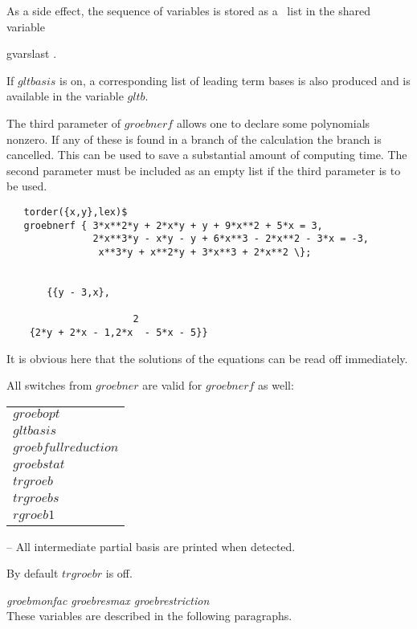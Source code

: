 As a side effect, the sequence of variables is stored as a \REDUCE \  list in
the shared variable
\begin{center}
gvarslast .
\end{center}
If $gltbasis$ is on, a corresponding list of leading term bases is
also produced and is available in the variable $gltb$.

The third parameter of $groebnerf$ allows one to declare some polynomials
nonzero. If any of these is found in a branch of the calculation
the branch is cancelled. This can be used to save a substantial amount
of computing time. The second parameter must be included as an
empty list if the third parameter is to be used.

\begin{verbatim}
   torder({x,y},lex)$
   groebnerf { 3*x**2*y + 2*x*y + y + 9*x**2 + 5*x = 3,
               2*x**3*y - x*y - y + 6*x**3 - 2*x**2 - 3*x = -3,
                x**3*y + x**2*y + 3*x**3 + 2*x**2 \};


       {{y - 3,x},

                      2
    {2*y + 2*x - 1,2*x  - 5*x - 5}}
\end{verbatim}

It is obvious here that the solutions of the equations can be read
off immediately.

All switches from $groebner$ are valid for $groebnerf$ as well:
\begin{center}
\begin{tabular}{l}
$groebopt$ \\
$gltbasis$ \\
$groebfullreduction$ \\
$groebstat$ \\
$trgroeb$ \\
$trgroebs$ \\
$rgroeb1$
\end{tabular}
\end{center}

\begin{description}

\item[$trgroebr$] -- All intermediate partial basis are printed when
detected.

By default $trgroebr$ is off.
\end{description}
{\it groebmonfac  groebresmax  groebrestriction} \\
\hspace*{.5cm} These variables are described in the following
paragraphs.

